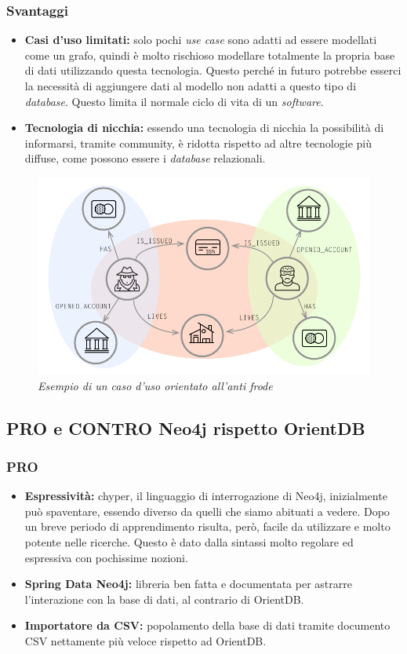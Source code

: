 \subsubsection{Svantaggi}
\begin{itemize}
\item{\textbf{Casi d'uso limitati:}} solo pochi \textit{use case} sono adatti ad essere modellati come un grafo, quindi è molto rischioso modellare totalmente la propria base di dati utilizzando questa tecnologia. Questo perché in futuro potrebbe esserci la necessità di aggiungere dati al modello non adatti a questo tipo di \textit{database}. Questo limita il normale ciclo di vita di un \textit{software}.
\item{\textbf{Tecnologia di nicchia:}} essendo una tecnologia di nicchia la possibilità di informarsi, tramite community, è ridotta rispetto ad altre tecnologie più diffuse, come possono essere i \textit{database} relazionali.
\end{itemize}
\newpage
\begin{figure}[!ht]
	\centering
	\includegraphics[scale=0.33]{immagini/fraud.png}
	\caption{\textit{Esempio di un caso d'uso orientato all'anti frode }}
\end{figure}


\subsection{PRO e CONTRO Neo4j rispetto OrientDB}
\subsubsection{PRO}
\begin{itemize}
\item{\textbf{Espressività:}} chyper, il linguaggio di interrogazione di Neo4j, inizialmente può spaventare, essendo diverso da quelli che siamo abituati a vedere. Dopo un breve periodo di apprendimento risulta, però, facile da utilizzare e molto potente nelle ricerche. Questo è dato dalla sintassi molto regolare ed espressiva con pochissime nozioni.
\item{\textbf{Spring Data Neo4j:}} libreria ben fatta e documentata per astrarre l'interazione con la base di dati, al contrario di OrientDB.
\item{\textbf{Importatore da CSV:}} popolamento della base di dati tramite documento CSV nettamente più veloce rispetto ad OrientDB.
\end{itemize}
